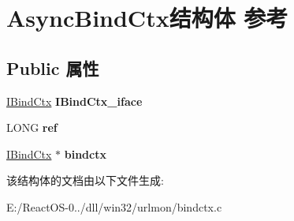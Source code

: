 \hypertarget{struct_async_bind_ctx}{}\section{Async\+Bind\+Ctx结构体 参考}
\label{struct_async_bind_ctx}
\subsection*{Public 属性}
\begin{DoxyCompactItemize}
\item 
\mbox{\label{struct_async_bind_ctx_a512d8f1c837788734aa20e8c8fb6bcab}} 
\hyperlink{interface_i_bind_ctx}{I\+Bind\+Ctx} {\bfseries I\+Bind\+Ctx\+\_\+iface}
\item 
\mbox{\label{struct_async_bind_ctx_afc684fcc9b18fb62386be15e409476a6}} 
L\+O\+NG {\bfseries ref}
\item 
\mbox{\label{struct_async_bind_ctx_a7f86ee561fe01918eec3444455c3965e}} 
\hyperlink{interface_i_bind_ctx}{I\+Bind\+Ctx} $\ast$ {\bfseries bindctx}
\end{DoxyCompactItemize}


该结构体的文档由以下文件生成\+:\begin{DoxyCompactItemize}
\item 
E\+:/\+React\+O\+S-\/0../dll/win32/urlmon/bindctx.\+c\end{DoxyCompactItemize}
